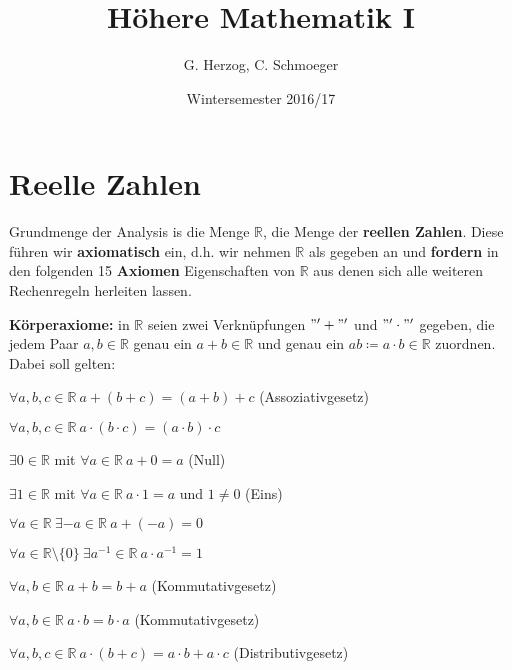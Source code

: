 \documentclass[titlepage,ngerman,a4paper,headsepline,DIV15,halfparskip*,14pt]{scrartcl}
\title{Höhere Mathematik I}
\author{G. Herzog, C. Schmoeger}
\date{Wintersemester 2016/17}
\newcommand{\R}{\mathbb{R}}
\theoremstyle{dotless}
\begin{document}
	
\maketitle

\tableofcontents
 \newpage
  
\section{Reelle Zahlen}

Grundmenge der Analysis is die Menge $\R$, die Menge der \textbf{reellen Zahlen}. Diese führen wir \textbf{axiomatisch} ein, d.h. wir nehmen $\R$ als gegeben an und \textbf{fordern} in den folgenden 15 \textbf{Axiomen} Eigenschaften von $\R$ aus denen sich alle weiteren Rechenregeln herleiten lassen.
\newline

\textbf{Körperaxiome:} in $\R$ seien zwei Verknüpfungen $"'+"'$ und $"'\cdot"'$ gegeben, die jedem Paar $a, b \in \R$ genau ein $a + b \in \R$ und genau ein $a b \coloneqq a \cdot b \in \R$ zuordnen. Dabei soll gelten:


\begin{description} \label{k.axiom}
	\label{k.axiom-a1}
	\item[\hspace{0.4cm}$(A1)$] $\forall a, b, c \in \R \: a + \left( b + c \right) = \left( a + b \right) + c$  (Assoziativgesetz)
	\label{k.axiom-a5}
	\item[\hspace{0.4cm}$(A5)$] $\forall a, b, c \in \R \: a \cdot \left( b \cdot c \right) = \left( a \cdot b \right) \cdot c$
	\label{k.axiom-a2}
	\item[\hspace{0.4cm}$(A2)$] $\exists 0 \in \R$ mit $\forall a \in \R \: a + 0 = a$ (Null)
	\label{k.axiom-a6}
	\item[\hspace{0.4cm}$(A6)$] $\exists 1 \in \R$ mit $\forall a \in \R \: a \cdot 1 = a$ und $1 \neq 0$ (Eins)
	\label{k.axiom-a3}
	\item[\hspace{0.4cm}$(A3)$] $\forall a \in \R ~ \exists -a \in \R \: a + (-a) = 0$
	\label{k.axiom-a7}
	\item[\hspace{0.4cm}$(A7)$] $\forall a \in \R \setminus \{ 0 \} ~ \exists a^{-1} \in \R \: a \cdot a^{-1} = 1$
	\label{k.axiom-a4}
	\item[\hspace{0.4cm}$(A4)$] $\forall a, b \in \R \: a + b = b + a$ (Kommutativgesetz)
	\label{k.axiom-a8}
	\item[\hspace{0.4cm}$(A8)$] $\forall a, b \in \R \: a \cdot b = b \cdot a$ (Kommutativgesetz)
	\label{k.axiom-a9}
	\item[\hspace{0.4cm}$(A9)$] $\forall a, b, c \in \R \: a \cdot (b + c) = a \cdot b + a \cdot c$ (Distributivgesetz)
\end{description}
\end{document}
